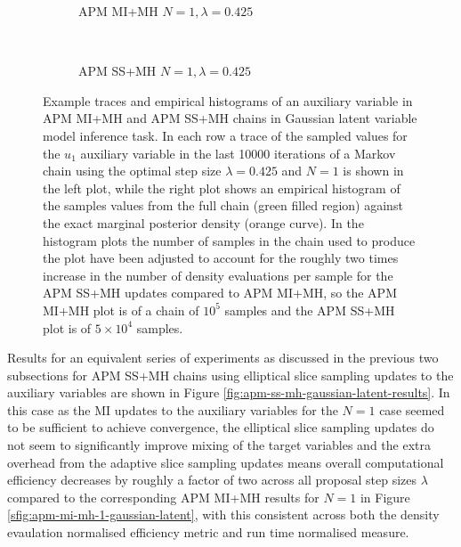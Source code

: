 \begin{figure}[t]
\centering
\begin{subfigure}[b]{\linewidth}
\centering
  \vspace{-5mm}
  \caption{\ac{APM} \ac{MI}+\ac{MH} $N=1, \lambda=0.425$}
  \label{sfig:apm-mi-mh-1-gaussian-latent-u-trace}
\end{subfigure}
\\[3mm]
\begin{subfigure}[b]{\linewidth}
\centering
  \vspace{-5mm}
  \caption{\ac{APM} \ac{SS}+\ac{MH} $N=1, \lambda=0.425$}
  \label{sfig:apm-ss-mh-1-gaussian-latent-u-trace}
\end{subfigure}
\caption[\acs{APM} Gaussian model auxiliary variable traces.]{
Example traces and empirical histograms of an auxiliary variable in \ac{APM} \ac{MI}+\ac{MH} and \ac{APM} \ac{SS}+\ac{MH} chains in Gaussian latent variable model inference task. In each row a trace of the sampled values for the $u_1$ auxiliary variable in the last 10000 iterations of a Markov chain using the optimal step size $\lambda=0.425$ and $N=1$ is shown in the left plot, while the right plot shows an empirical histogram of the samples values from the full chain (green filled region) against the exact marginal posterior density (orange curve). In the histogram plots the number of samples in the chain used to produce the plot have been adjusted to account for the roughly two times increase in the number of density evaluations per sample for the  
\ac{APM} \ac{SS}+\ac{MH} updates compared to \ac{APM} \ac{MI}+\ac{MH}, so the \ac{APM} \ac{MI}+\ac{MH} plot is of a chain of $10^5$ samples and the \ac{APM} \ac{SS}+\ac{MH} plot is of $5\times 10^4$ samples.}
\label{fig:apm-mh-gaussian-latent-u-traces}
\end{figure}

Results for an equivalent series of experiments as discussed in the previous two subsections for \ac{APM} \ac{SS}+\ac{MH} chains using elliptical slice sampling updates to the auxiliary variables are shown in Figure \ref{fig:apm-ss-mh-gaussian-latent-results}. In this case as the \ac{MI} updates to the auxiliary variables for the $N=1$ case seemed to be sufficient to achieve convergence, the elliptical slice sampling updates do not seem to significantly improve mixing of the target variables and the extra overhead from the adaptive slice sampling updates means overall computational efficiency decreases by roughly a factor of two across all proposal step sizes $\lambda$ compared to the corresponding \ac{APM} \ac{MI}+\ac{MH} results for $N=1$ in Figure \ref{sfig:apm-mi-mh-1-gaussian-latent}, with this consistent across both the density evaulation normalised efficiency metric and run time normalised measure. 

